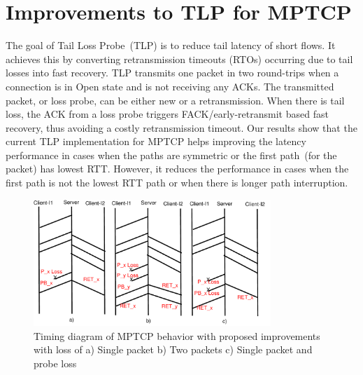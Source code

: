 \documentclass[10pt,conference]{IEEEtran}
\begin{document}
\section{Improvements to TLP for MPTCP}\label{impr}
The goal of Tail Loss Probe~(TLP) is to reduce tail latency of short flows. It achieves this by converting retransmission timeouts (RTOs) occurring
due to tail losses into fast recovery. TLP transmits one packet in two round-trips when a connection is in Open state and is not receiving any ACKs.
The transmitted packet, or loss probe, can be either new or a retransmission. When there is tail loss, the ACK from a loss probe triggers 
FACK/early-retransmit based fast recovery, thus avoiding a costly retransmission timeout. Our results show that the current TLP implementation for 
MPTCP helps improving the latency performance in cases when the paths are symmetric or the first path~(for the packet) has lowest RTT. However, 
it reduces the performance in cases when the first path is not the lowest RTT path or when there is longer path interruption.

\begin{figure}
\begin{center}
    \includegraphics[angle=0, width=0.8\textwidth]{images/timingER3NewTLP1}
\end{center}
\caption{Timing diagram of MPTCP behavior with proposed improvements with loss of a) Single packet b) Two packets c) Single packet and probe loss}\label{timingNew}
\end{figure}
\end{document}
